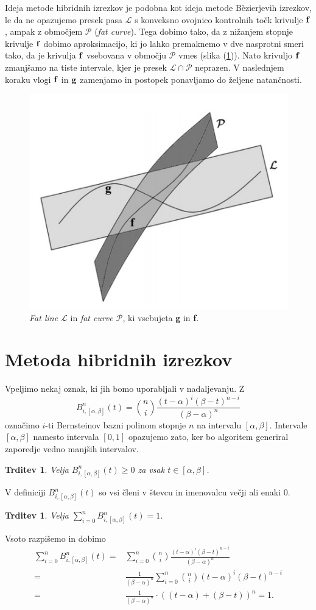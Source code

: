 \documentclass[12pt,a4paper, reqno]{amsart}
\newtheorem{trditev}[definicija]{Trditev}
\let\oldref\ref
\renewcommand{\ref}[1]{(\oldref{#1})}
\begin{document}
Ideja metode hibridnih izrezkov je podobna kot ideja metode B\`{e}zierjevih izrezkov, le da ne opazujemo presek pasa $\mathcal{L}$ s konveksno ovojnico kontrolnih točk krivulje ${\bf f}$, ampak z območjem $\mathcal{P}$ ({\em fat curve}). Tega dobimo tako, da z nižanjem stopnje krivulje ${\bf f}$ dobimo aproksimacijo, ki jo lahko premaknemo v dve nasprotni smeri tako, da je krivulja ${\bf f}$ vsebovana v območju $\mathcal{P}$ vmes (slika \ref{slika2}). Nato krivuljo ${\bf f}$ zmanjšamo na tiste intervale, kjer je presek $\mathcal{L}\cap\mathcal{P}$ neprazen. V naslednjem koraku vlogi ${\bf f}$ in ${\bf g}$ zamenjamo in postopek ponavljamo do željene natančnosti.
\begin{figure}[!h]
  \centering
    \includegraphics[width=0.40\linewidth]{2}
  	\caption{{\em Fat line $\mathcal{L}$} in {\em fat curve $\mathcal{P}$}, ki vsebujeta {\bf g} in {\bf f}.}
  	\label{slika2}
\end{figure}
\medskip

\section{Metoda hibridnih izrezkov}
Vpeljimo nekaj oznak, ki jih bomo uporabljali v nadaljevanju. Z 
\begin{equation*}
B_{i,[\alpha,\beta]}^n(t) = \binom{n}{i} \frac{(t-\alpha)^i(\beta - t)^{n-i}}{(\beta - \alpha)^n}
\end{equation*}
označimo $i$-ti Bernsteinov bazni polinom stopnje $n$ na intervalu $[\alpha,\beta]$. Intervale $[\alpha,\beta]$ namesto intervala $[0,1]$ opazujemo zato, ker bo algoritem generiral zaporedje vedno manjših intervalov.

\begin{trditev}
Velja $B_{i,[\alpha,\beta]}^n(t) \geq 0$ za vsak $t\in [\alpha,\beta]$.
\end{trditev}
\proof V definiciji $B_{i,[\alpha,\beta]}^n(t)$ so vsi členi v števcu in imenovalcu večji ali enaki $0$.
\endproof
\begin{trditev}
Velja $\sum _{i=0}^n{B_{i,[\alpha,\beta]}^n(t)} = 1$.
\end{trditev}
\proof
Vsoto razpišemo in dobimo
\begin{equation*}
\begin{split}
\sum _{i=0}^n{B_{i,[\alpha,\beta]}^n(t)} = &
\sum _{i=0}^n \binom{n}{i} \frac{(t-\alpha)^i(\beta - t)^{n-i}}{(\beta - \alpha)^n} \\
=& 
\frac{1}{(\beta - \alpha)^n}\sum _{i=0}^n \binom{n}{i}(t-\alpha)^i(\beta - t)^{n-i} \\
= &\frac{1}{(\beta - \alpha)^n} \cdot ((t - \alpha) + (\beta - t))^n = 1.
\end{split}
\end{equation*}
\endproof
\end{document}

